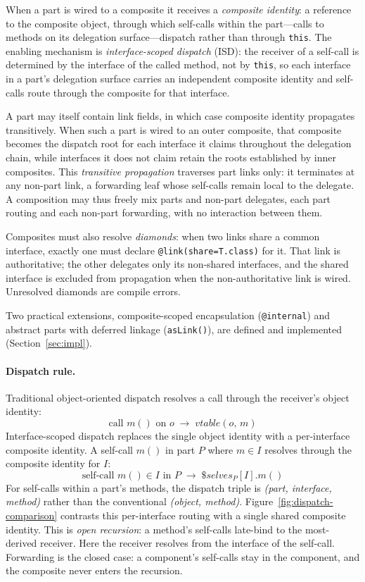\documentclass[sigplan,10pt,review,anonymous]{acmart}
\theoremstyle{acmplain}
\newcommand{\code}[1]{\texttt{#1}}
\begin{document}
When a part is wired to a composite it receives a \emph{composite identity}: a
reference to the composite object, through which self-calls within the
part---calls to methods on its delegation surface---dispatch rather than through
\code{this}. The enabling mechanism is \emph{interface-scoped dispatch} (ISD):
the receiver of a self-call is determined by the interface of the called method,
not by \code{this}, so each interface in a part's delegation surface carries an
independent composite identity and self-calls route through the composite for
that interface.

A part may itself contain link fields, in which case composite identity
propagates transitively. When such a part is wired to an outer composite, that
composite becomes the dispatch root for each interface it claims throughout the
delegation chain, while interfaces it does not claim retain the roots
established by inner composites. This \emph{transitive propagation} traverses
part links only: it terminates at any non-part link, a forwarding leaf whose
self-calls remain local to the delegate. A composition may thus freely mix parts
and non-part delegates, each part routing and each non-part forwarding, with no
interaction between them.

Composites must also resolve \emph{diamonds}: when two links share a common
interface, exactly one must declare \code{@link(share=T.class)} for it. That
link is authoritative; the other delegates only its non-shared interfaces, and
the shared interface is excluded from propagation when the non-authoritative
link is wired. Unresolved diamonds are compile errors.

Two practical extensions, composite-scoped encapsulation (\code{@internal})
and abstract parts with deferred linkage (\code{asLink()}), are defined
and implemented (Section~\ref{sec:impl}).

\paragraph{Dispatch rule.}
Traditional object-oriented dispatch resolves a call through the receiver's
object identity:
\[ \text{call } m() \text{ on } o \;\longrightarrow\; \mathit{vtable}(o,\, m) \]
Interface-scoped dispatch replaces the single object identity with a
per-interface composite identity. A self-call $m()$ in part $P$ where
$m \in I$ resolves through the composite identity for $I$:
\[ \text{self-call } m() \in I \text{ in } P \;\longrightarrow\;
   \$\mathit{selves}_P[I].m() \]
For self-calls within a part's methods, the dispatch triple is
\emph{(part, interface, method)} rather than the conventional
\emph{(object, method)}.
Figure~\ref{fig:dispatch-comparison} contrasts this per-interface routing with a single shared composite identity.
This is \emph{open recursion}: a method's self-calls late-bind to the
most-derived receiver. Here the receiver resolves from the interface of the self-call. Forwarding is the closed case: a
component's self-calls stay in the component, and the composite never enters
the recursion.
\end{document}
